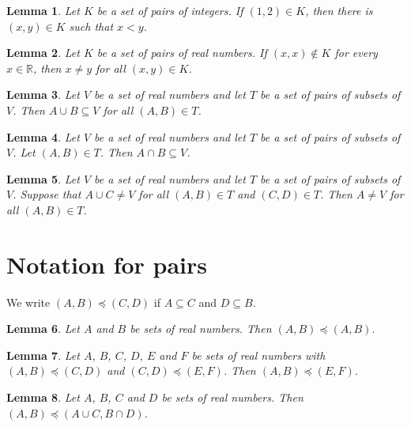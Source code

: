 \documentclass{article}
\newtheorem{lemma}{Lemma}
\begin{document}
\begin{lemma}\label{relation}
Let $K$ be a set of pairs of integers. If $(1,2)\in K$, then there is $(x,y)\in K$ such that $x<y$.
\end{lemma}

\begin{lemma}\label{diagonal}
Let $K$ be a set of pairs of real numbers. If $(x,x)\notin K$ for every $x\in\mathbb{R}$, then $x\neq y$ for all $(x,y)\in K$.
\end{lemma}

\begin{lemma}\label{orientations}
Let $V$ be a set of real numbers and let $T$ be a set of pairs of subsets of $V$. Then $A\cup B\subseteq V$ for all $(A,B)\in T$.
\end{lemma}

\begin{lemma}\label{chosen}
Let $V$ be a set of real numbers and let $T$ be a set of pairs of subsets of $V$. Let $(A,B)\in T$. Then $A\cap B\subseteq V$.
\end{lemma}

\begin{lemma}\label{crossing}
Let $V$ be a set of real numbers and let $T$ be a set of pairs of subsets of $V$. Suppose that $A\cup C\neq V$ for all $(A,B)\in T$ and $(C,D)\in T$. Then $A\neq V$ for all $(A,B)\in T$.
\end{lemma}

\section{Notation for pairs}

We write $(A,B)\preceq(C,D)$ if $A\subseteq C$ and $D\subseteq B$.

\begin{lemma}\label{reflexive}
Let $A$ and $B$ be sets of real numbers. Then $(A,B)\preceq(A,B)$.
\end{lemma}

\begin{lemma}\label{transitive}
Let $A$, $B$, $C$, $D$, $E$ and $F$ be sets of real numbers with $(A,B)\preceq(C,D)$ and $(C,D)\preceq(E,F)$. Then $(A,B)\preceq(E,F)$.
\end{lemma}

\begin{lemma}\label{supremum}
Let $A$, $B$, $C$ and $D$ be sets of real numbers. Then $(A,B)\preceq(A\cup C,B\cap D)$.
\end{lemma}
\end{document}
